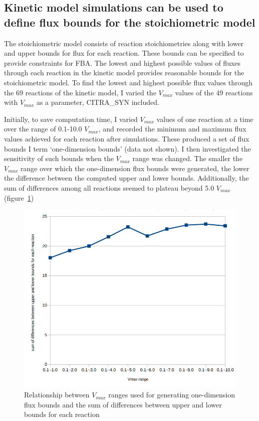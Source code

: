 \documentclass[a4paper, 12pt]{scrartcl}
\begin{document}
{\subsection*{Kinetic model simulations can be used to define flux bounds for the stoichiometric model}
\label{ssec:results-bounds}

The stoichiometric model consists of reaction stoichiometries along with lower and upper bounds for flux for each reaction. These bounds can be specified to provide constraints for FBA.
The lowest and highest possible values of fluxes through each reaction in the kinetic model provides reasonable bounds for the stoichiometric model.
To find the lowest and highest possible flux values through the 69 reactions of the kinetic model, I varied the $V_{max}$ values of the 49 reactions with $V_{max}$ as a parameter, CITRA\_SYN included.

Initially, to save computation time, I varied $V_{max}$ values of one reaction at a time over the range of 0.1-10.0 $V_{max}$, and recorded the minimum and maximum flux values achieved for each reaction after simulations. These produced a set of flux bounds I term `one-dimension bounds' (data not shown).
I then investigated the sensitivity of such bounds when the $V_{max}$ range was changed. The smaller the $V_{max}$ range over which the one-dimension flux bounds were generated, the lower the difference between the computed upper and lower bounds.  Additionally, the sum of differences among all reactions seemed to plateau beyond 5.0 $V_{max}$ (figure~\ref{fig:vmaxplateau})

\begin{figure}[h]
  \centering
  \includegraphics[scale=0.3]{vmaxplateau}
  \caption{Relationship between $V_{max}$ ranges used for generating one-dimension flux bounds and the sum of differences between upper and lower bounds for each reaction}
  \label{fig:vmaxplateau}
\end{figure}

}
\end{document}
